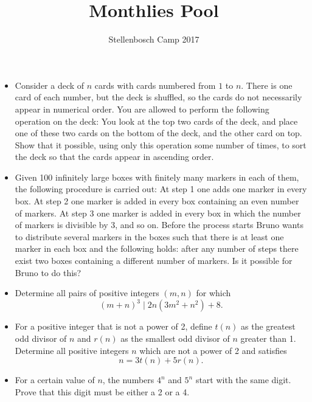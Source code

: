 \documentclass[12pt]{article}
\title{Monthlies Pool}
\author{Stellenbosch Camp 2017}
\begin{document}
 \maketitle

\begin{itemize}

\item %

Consider a deck of $n$ cards with cards numbered from $1$ to $n$. There is one card of each number, but the deck is shuffled, so the cards do not necessarily appear in numerical order. You are allowed to perform the following operation on the deck: You look at the top two cards of the deck, and place one of these two cards on the bottom of the deck, and the other card on top. Show that it possible, using only this operation some number of times, to sort the deck so that the cards appear in ascending order. 


\item %
Given 100 infinitely large boxes with finitely many markers in each of them, the following procedure is carried out: At step 1 one adds one marker in every box. At step 2 one marker is added in every box containing an even number of markers. At step 3 one marker is added in every box in which the number of markers is divisible by 3, and so on. Before the process starts Bruno wants to distribute several markers in the boxes such that there is at least one marker in each box and the following holds: after any number of steps there exist two boxes containing a different number of markers. Is it possible for Bruno to do this?


\item %
Determine all pairs of positive integers $(m,n)$ for which
	\[(m+n)^3 \mid 2n(3m^2+n^2) + 8.\]


\item %
For a positive integer that is not a power of 2, define $t(n)$ as the greatest odd divisor of $n$ and $r(n)$ as the smallest odd divisor of $n$ greater than 1. Determine all positive integers $n$ which are not a power of 2 and satisfies
	\[ n = 3t(n)+5r(n).\]


\item %
For a certain value of $n$, the numbers $4^n$ and $5^n$ start with the same digit. Prove that this digit must be either a 2 or a 4.



\end{itemize}
\end{document}
